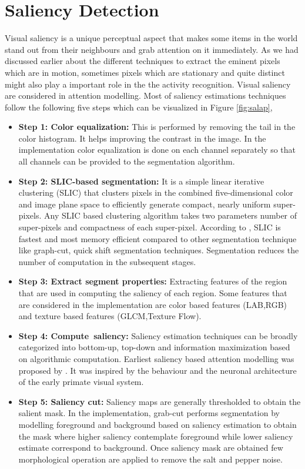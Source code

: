 \section{Saliency Detection}
\label{sec:sal}
Visual saliency is a unique perceptual aspect that makes some items in the world stand out from their neighbours and grab attention on it immediately.  As we had discussed earlier about the different techniques to extract the eminent pixels which are in motion, sometimes pixels which are stationary and quite distinct might also play a important role in the the activity recognition.  Visual saliency are considered in attention modelling.  Most of saliency estimations techniques follow the following five steps which can be visualized in Figure \ref{fig:salap},
\begin{itemize}
\item{\textbf{Step 1: Color equalization:} This is performed by removing the tail in the color histogram.  It helps improving the contrast in the image.  In the implementation color equalization is done on each channel separately so that all channels can be provided to the segmentation algorithm.}

\item{ \textbf{Step 2: SLIC-based segmentation:}  It is a simple linear iterative clustering (SLIC) that clusters pixels in the combined five-dimensional color and image plane space to efficiently generate compact, nearly uniform super-pixels.  Any SLIC based clustering algorithm takes two parameters number of super-pixels and compactness of each super-pixel.  According to \cite{slic}, SLIC is fastest and most memory efficient compared to  other segmentation technique like graph-cut, quick shift segmentation techniques.  Segmentation reduces the number of computation in the subsequent stages.}

\item{ \textbf{Step 3: Extract segment properties:} Extracting features of the region that are used in computing the saliency of each region.  Some features that are considered in the implementation are color based features (LAB,RGB) and texture based features (GLCM,Texture Flow).}

\item{\textbf{Step 4: Compute~saliency:} Saliency estimation techniques can be broadly categorized into bottom-up, top-down and information maximization based on algorithmic computation. Earliest saliency based attention modelling was proposed by \cite{itti}.  It was inspired by the behaviour and the neuronal architecture of the early primate visual system.}

\item{\textbf{Step 5: Saliency cut:} Saliency maps are generally thresholded to obtain the salient mask.  In the implementation, grab-cut\citep{grabCut} performs segmentation by modelling foreground and background based on saliency estimation to obtain the mask where higher saliency  contemplate foreground while lower saliency estimate correspond to background.  Once saliency mask are obtained few morphological operation are applied to remove the salt and pepper noise.}
\end{itemize}

